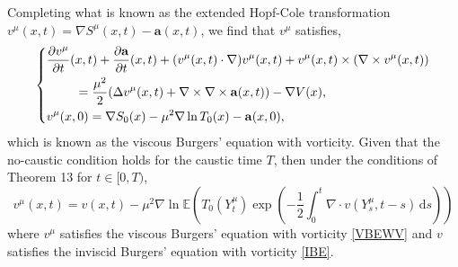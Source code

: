 \documentclass[a4paper,12pt,draft]{report}
\begin{document}
Completing what is known as the extended Hopf-Cole transformation\\$v^\mu(x, t) = \nabla S^\mu(x, t) - \mathbf{a}(x, t)$, we find that $v^\mu$ satisfies,
\begin{equation}
\left\{
\begin{aligned}
& \frac{\partial v^\mu}{\partial t}(x, t) + \frac{\partial\mathbf{a}}{\partial t}(x, t) + (v^\mu(x, t)\cdot\nabla)v^\mu(x, t) + v^\mu(x, t)\times(\nabla\times v^\mu(x, t))\\ \label{VBEWV}
& \hspace{0.8cm} = \frac{\mu^2}{2}(\Delta v^\mu(x, t) + \nabla\times\nabla\times\mathbf{a}(x, t)) - \nabla V(x),\\
& v^\mu(x, 0) = \nabla S_0(x) - \mu^2\nabla\ln T_0(x) - \mathbf{a}(x, 0),
\end{aligned}
\right.
\end{equation}
which is known as the viscous Burgers' equation with vorticity.
\corollary
{
Given that the no-caustic condition holds for the caustic time $T$, then under the conditions of Theorem 13 for $t \in [0, T)$,
$$
v^\mu(x, t) = v(x, t) - \mu^2\nabla\ln\mathbb{E}\left(T_0(Y_t^\mu)\exp\left(-\frac{1}{2}\int_0^t\nabla\cdot v(Y_s^\mu, t -s)\,\mathrm{d}s\right)\right)
$$
where $v^\mu$ satisfies the viscous Burgers' equation with vorticity \eqref{VBEWV} and $v$ satisfies the inviscid Burgers' equation with vorticity \eqref{IBE}.
}
\proof
\end{document}
